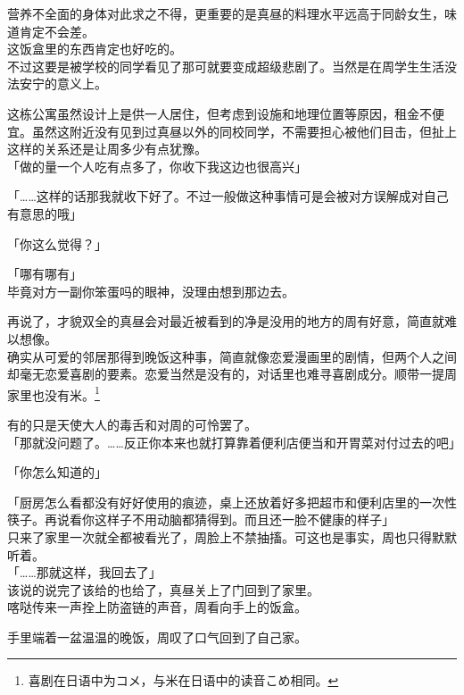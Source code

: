 营养不全面的身体对此求之不得，更重要的是真昼的料理水平远高于同龄女生，味道肯定不会差。\\

这饭盒里的东西肯定也好吃的。\\

不过这要是被学校的同学看见了那可就要变成超级悲剧了。当然是在周学生生活没法安宁的意义上。

这栋公寓虽然设计上是供一人居住，但考虑到设施和地理位置等原因，租金不便宜。虽然这附近没有见到过真昼以外的同校同学，不需要担心被他们目击，但扯上这样的关系还是让周多少有点犹豫。\\

「做的量一个人吃有点多了，你收下我这边也很高兴」

「……这样的话那我就收下好了。不过一般做这种事情可是会被对方误解成对自己有意思的哦」

「你这么觉得？」

「哪有哪有」\\

毕竟对方一副你笨蛋吗的眼神，没理由想到那边去。

再说了，才貌双全的真昼会对最近被看到的净是没用的地方的周有好意，简直就难以想像。\\

确实从可爱的邻居那得到晚饭这种事，简直就像恋爱漫画里的剧情，但两个人之间却毫无恋爱喜剧的要素。恋爱当然是没有的，对话里也难寻喜剧成分。顺带一提周家里也没有米。\footnote{喜剧在日语中为{\jpfont コメ}，与米在日语中的读音{\jpfont こめ}相同。}

有的只是天使大人的毒舌和对周的可怜罢了。\\

「那就没问题了。……反正你本来也就打算靠着便利店便当和开胃菜对付过去的吧」

「你怎么知道的」

「厨房怎么看都没有好好使用的痕迹，桌上还放着好多把超市和便利店里的一次性筷子。再说看你这样子不用动脑都猜得到。而且还一脸不健康的样子」\\

只来了家里一次就全都被看光了，周脸上不禁抽搐。可这也是事实，周也只得默默听着。\\

「……那就这样，我回去了」\\

该说的说完了该给的也给了，真昼关上了门回到了家里。\\

喀哒传来一声拴上防盗链的声音，周看向手上的饭盒。

手里端着一盆温温的晚饭，周叹了口气回到了自己家。\\


